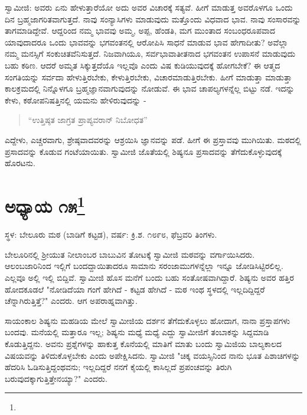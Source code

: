 ಸ್ವಾಮೀಜಿ: ಅವರು ಏನು ಹೇಳುತ್ತಾರೆಯೋ ಅದು ಅವರ ವಿಚಾರಕ್ಕೆ ಸತ್ಯವೆ. ಹೀಗೆ ಮಾಡುತ್ತ ಅವರೊಳಗೂ ಒಂದು ದಿನ ಬ್ರಹ್ಮಜಾಗರಿತವಾಗುತ್ತದೆ. ನಾವು ಸಂನ್ಯಾಸಿಗಳು ಮಾಡುವುದು ಮತ್ತೊಂದು ವಿಧವಾದ ಭಾವ. ನಾವು ಸಂಸಾರವನ್ನು ತಾಗಮಾಡಿದ್ದೇವೆ. ಆದ್ದರಿಂದ ನಮ್ಮ ಭಾವವು ಅಮ್ಮ, ಅಪ್ಪ, ಹೆಂಡತಿ, ಮಗ ಮುಂತಾದ ಸಂಬಂಧರೂಪವಾದ ಯಾವುದಾದರೂ ಒಂದು ಭಾವವನ್ನು ಭಗವಂತನಲ್ಲಿ ಆರೋಪಿಸಿ ಸಾಧನೆ ಮಾಡುವ ಭಾವ ಹೇಗಾದೀತು? ಅವೆಲ್ಲಾ ನಮ್ಮ ಮನಸ್ಸಿಗೆ ಸಂಕುಚಿತವೆನಿಸುತ್ತದೆ. ನಿಜವಾಗಿಯೂ, ಸರ್ವಭಾವಾತೀತನಾದ ಭಗವಂತನ ಉಪಾಸನೆ ಮಾಡುವುದು ಬಹು ಕಠಿಣ. ಆದರೆ ಅಮೃತ ಸಿಕ್ಕುತ್ತದೆಯೊ ಇಲ್ಲವೊ ಎಂದು ವಿಷ ಕುಡಿಯುವುದಕ್ಕೆ ಹೋಗಬೇಕೆ? ಈ ಆತ್ಮದ ಸಂಗತಿಯನ್ನು ಸರ್ವದಾ ಹೇಳುತ್ತಿರಬೇಕು, ಕೇಳುತ್ತಿರಬೇಕು, ವಿಚಾರಮಾಡುತ್ತಿರಬೇಕು. ಹೀಗೆ ಮಾಡುತ್ತಾ ಮಾಡುತ್ತಾ ಕಾಲಕ್ರಮದಲ್ಲಿ ನಿನ್ನೊಳಗೂ ಬ್ರಹ್ಮಜ್ಞಾನವಾಗುವುದನ್ನು ನೋಡುವೆ. ಈ ಭಾವ ಚಾಪಲ್ಯಗಳನ್ನೆಲ್ಲ ಬಿಟ್ಟು ನಡೆ. ಇದನ್ನು ಕೇಳು, ಕಠೋಪನಿಷತ್ತಿನಲ್ಲಿ ಯಮನು ಹೇಳಿರುವುದನ್ನು -

\begin{verse}
“ಉತ್ತಿಷ್ಠತ ಜಾಗ್ರತ ಪ್ರಾಪ್ಯವರಾನ್ ನಿಬೋಧತ”
\end{verse}

ಎದ್ದೇಳು, ಎಚ್ಚರವಾಗು, ಶ್ರೇಷ್ಠವಾದವರನ್ನು ಆಶ್ರಯಿಸಿ ಜ್ಞಾನವನ್ನು ಪಡೆ. ಹೀಗೆ ಈ ಪ್ರಸ್ತಾವವು ಮುಗಿಯಿತು. ಮಠದಲ್ಲಿ ಪ್ರಸಾದವನ್ನು ಕೊಡುವ ಗಂಟೆಯಾಯಿತು. ಸ್ವಾಮೀಜಿ ಜೊತೆಯಲ್ಲಿ ಶಿಷ್ಯನೂ ಪ್ರಸಾದವನ್ನು ತೆಗೆದುಕೊಳ್ಳುವುದಕ್ಕೆ ಹೊರಟನು.

\newpage

\chapter[ಅಧ್ಯಾಯ ೧೫]{ಅಧ್ಯಾಯ ೧೫\protect\footnote{}}

\begin{center}
ಸ್ಥಳ: ಬೇಲೂರು ಮಠ (ಬಾಡಿಗೆ ಕಟ್ಟಡ), ವರ್ಷ: ಕ್ರಿ.ಶ. ೧೮೯೮, ಫೆಬ್ರವರಿ ತಿಂಗಳು.
\end{center}

ಬೇಲೂರಿನಲ್ಲಿ ಶ‍್ರೀಯುತ ನೀಲಾಂಬರ ಬಾಬುವಿನ ತೋಟಕ್ಕೆ ಸ್ವಾಮೀಜಿ ಮಠವನ್ನು ವರ್ಗಾಯಿಸಿದರು. ಆಲಂಬಜಾರಿನಿಂದ ಇಲ್ಲಿಗೆ ಬಂದದ್ದಾಯಿತಾದರೂ ಸಾಮಾನು ಸರಂಜಾಮುಗಳನ್ನೆಲ್ಲಾ ಇನ್ನೂ ಜೋಡಿಸಿಟ್ಟಿರಲಿಲ್ಲ. ಎಲ್ಲವೂ ಅಲ್ಲಿ ಇಲ್ಲಿ ಬಿದ್ದಿವೆ. ಸ್ವಾಮೀಜಿ ಹೊಸ ಮನೆಗೆ ಬಂದು ಬಹು ಸಂತೋಷವಾಗಿದ್ದಾರೆ. ಶಿಷ್ಯನು ಅವರ ಹತ್ತಿರ ಹೋದಕೂಡಲೆ "ನೋಡಿದೆಯಾ ಗಂಗೆ ಹೇಗಿದೆ - ಕಟ್ಟಡ ಹೇಗಿದೆ - ಮಠ ಇಂಥ ಸ್ಥಳದಲ್ಲಿ ಇಲ್ಲದಿದ್ದಿದ್ದರೆ ಚೆನ್ನಾಗಿರುತ್ತಿತ್ತೆ?" ಎಂದರು. ಆಗ ಅಪರಾಹ್ನವಾಗಿತ್ತು.

ಸಾಯಂಕಾಲ ಶಿಷ್ಯನು ಮಹಡಿಯ ಮೇಲೆ ಸ್ವಾಮೀಜಿಯ ದರ್ಶನ ತೆಗೆದುಕೊಳ್ಳಲು ಹೋದಾಗ, ನಾನಾ ಪ್ರಸ್ತಾಪಗಳು ಬಂದವು. ಮನೆಯಲ್ಲಿ ಮತ್ತಾರೂ ಇಲ್ಲ; ಶಿಷ್ಯನು ಮಧ್ಯೆ ಮಧ್ಯೆ ಎದ್ದು ಸ್ವಾಮೀಜಿಗೆ ತಂಬಾಕನ್ನು ಸಿದ್ದಮಾಡಿ ಕೊಡುತ್ತಿದ್ದನು. ಅವನು ಪ್ರಶ್ನೆಗಳನ್ನು ಹಾಕುತ್ತ ಕೊನೆಯಲ್ಲಿ ಮಾತಿಗೆ ಮಾತು ಬಂದು ಸ್ವಾಮಿಜಿಯ ಬಾಲ್ಯಕಾಲದ ವಿಷಯವನ್ನು ತಿಳಿದುಕೊಳ್ಳಬೇಕು ಎಂದು ಅಪೇಕ್ಷಿಸಿದನು. ಸ್ವಾಮೀಜಿ "ಚಿಕ್ಕ ವಯಸ್ಸಿನಿಂದ ನಾನು ಭೂತ ಪಿಶಾಚಿಗಳನ್ನು ಹೆದರಿಸಿ ಓಡಿಸುತ್ತಿದ್ದಂಥವನು; ಇಲ್ಲದಿದ್ದರೆ ನನಗೆ ಕೈಯಲ್ಲಿ ಕಾಸಿಲ್ಲದೆ ಪ್ರಪಂಚವನ್ನು ತಿರುಗಿ ಬರುವುದಕ್ಕಾಗುತ್ತಿತ್ತೇನಯ್ಯಾ?" ಎಂದರು.

